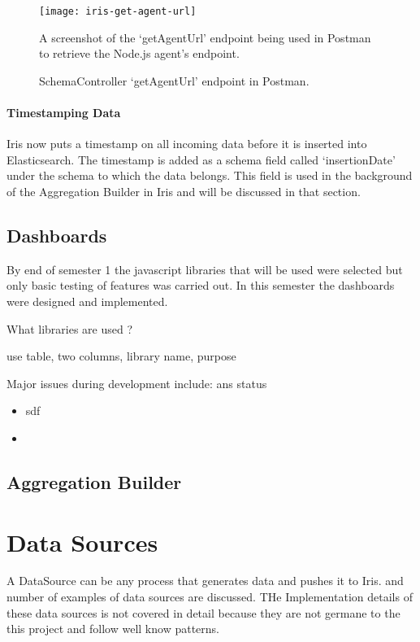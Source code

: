 \documentclass[12pt,a4paper,titlepage]{report}
\begin{document}
\begin{figure}[H]
\begin{tcolorbox}
\begin{center}
\texttt{[image: iris-get-agent-url]}
\end{center}
A screenshot of the `getAgentUrl' endpoint being used in Postman to retrieve the Node.js agent's endpoint.
\end{tcolorbox}
\caption{SchemaController `getAgentUrl' endpoint in Postman.}
\end{figure}

\paragraph{Timestamping Data}
Iris now puts a timestamp on all incoming data before it is inserted into Elasticsearch. The timestamp is added as a schema field called `insertionDate' under the schema to which the data belongs. This field is used in the background of the Aggregation Builder in Iris and will be discussed in that section.

\subsection{Dashboards}

By end of semester 1 the javascript libraries that will be used were selected but only basic testing of features was carried out.  In this semester the dashboards were designed and implemented.

What libraries are used ?

use table, two columns, library name, purpose

Major issues during development include: ans status
\begin{itemize}
    \item sdf
    \item 
\end{itemize}

\subsection{Aggregation Builder}


\section{Data Sources}

A DataSource can be any process that generates data and pushes it to Iris. %
and number of examples of data sources are discussed. THe Implementation details of these data sources is not covered in detail because they are not germane to the this project and follow well know patterns.
\end{document}
